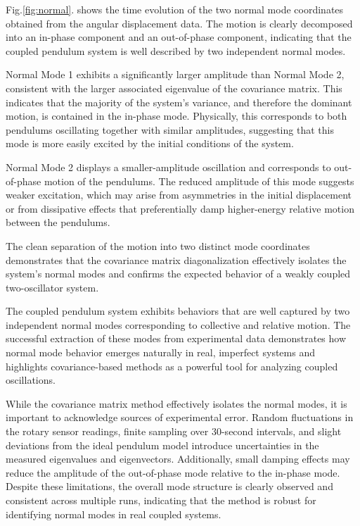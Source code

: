\documentclass[rc]{physicsinprogress}
\begin{document}
Fig.\ref{fig:normal}. shows the time evolution of the two normal mode coordinates obtained from the angular displacement data. The motion is clearly decomposed into an in-phase component and an out-of-phase component, indicating that the coupled pendulum system is well described by two independent normal modes.

Normal Mode 1 exhibits a significantly larger amplitude than Normal Mode 2, consistent with the larger associated eigenvalue of the covariance matrix. This indicates that the majority of the system’s variance, and therefore the dominant motion, is contained in the in-phase mode. Physically, this corresponds to both pendulums oscillating together with similar amplitudes, suggesting that this mode is more easily excited by the initial conditions of the system.

Normal Mode 2 displays a smaller-amplitude oscillation and corresponds to out-of-phase motion of the pendulums. The reduced amplitude of this mode suggests weaker excitation, which may arise from asymmetries in the initial displacement or from dissipative effects that preferentially damp higher-energy relative motion between the pendulums.

The clean separation of the motion into two distinct mode coordinates demonstrates that the covariance matrix diagonalization effectively isolates the system’s normal modes and confirms the expected behavior of a weakly coupled two-oscillator system.

The coupled pendulum system exhibits behaviors that are well captured by two independent normal modes corresponding to collective and relative motion. The successful extraction of these modes from experimental data demonstrates how normal mode behavior emerges naturally in real, imperfect systems and highlights covariance-based methods as a powerful tool for analyzing coupled oscillations.

While the covariance matrix method effectively isolates the normal modes, it is important to acknowledge sources of experimental error. Random fluctuations in the rotary sensor readings, finite sampling over 30-second intervals, and slight deviations from the ideal pendulum model introduce uncertainties in the measured eigenvalues and eigenvectors. Additionally, small damping effects may reduce the amplitude of the out-of-phase mode relative to the in-phase mode. Despite these limitations, the overall mode structure is clearly observed and consistent across multiple runs, indicating that the method is robust for identifying normal modes in real coupled systems.
\end{document}
